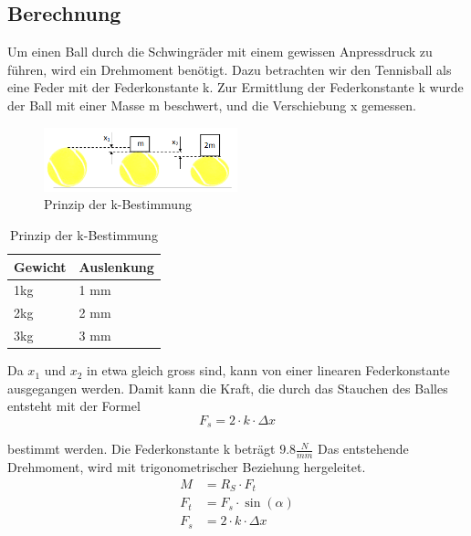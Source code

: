 \subsection{Berechnung}
Um einen Ball durch die Schwingräder mit einem gewissen Anpressdruck zu führen, wird ein Drehmoment benötigt. Dazu betrachten wir den Tennisball als eine Feder mit der Federkonstante k.
Zur Ermittlung der Federkonstante k wurde der Ball mit einer Masse m beschwert, und die Verschiebung x gemessen.

\begin{figure}[h!]
	\centering
	\includegraphics[width=0.5\textwidth]{Enddokumentation/Anhang/Bilder/KompressionBaelle.png}
	\caption{Prinzip der k-Bestimmung}
	\label{fig:BallKomp}
\end{figure}

\begin{table}[h!]
	\begin{tabular}{p{1.5cm}p{1.7cm}}
		Gewicht & Auslenkung\\
		\hline
		1kg & 1 mm\\
		2kg & 2 mm\\
		3kg & 3 mm\\
	\end{tabular}
	\centering
	\caption{Prinzip der k-Bestimmung}
	\label{tab:BallKompErgebnis}
\end{table}

Da $x_1$ und $x_2$ in etwa gleich gross sind, kann von einer linearen Federkonstante ausgegangen werden. Damit kann die Kraft, die durch das Stauchen des Balles entsteht mit der Formel
\begin{equation}  
    F_s=2\cdot k \cdot \Delta x 
\end{equation}

bestimmt werden. Die Federkonstante k beträgt $9.8\frac{N}{mm}$ Das entstehende Drehmoment, wird mit trigonometrischer Beziehung hergeleitet.
\begin{align}  
    \label{equ:Formel_M} %
    M &= R_S \cdot F_t\\
    F_t &= F_s \cdot \sin(\alpha)\\ 
    F_s &= 2\cdot k \cdot \Delta x 
\end{align}

